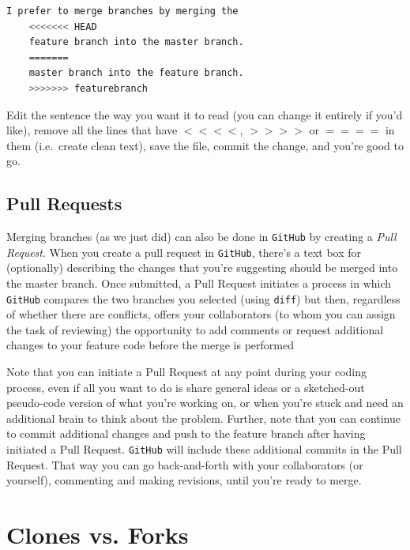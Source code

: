 \documentclass[12pt,letterpaper]{article}
\begin{document}
\begin{lstlisting}[language=bash]
	I prefer to merge branches by merging the
	<<<<<<< HEAD
	feature branch into the master branch.
	=======
	master branch into the feature branch.
	>>>>>>> featurebranch
\end{lstlisting}

\noindent
Edit the sentence the way you want it to read
(you can change it entirely if you'd like), 
remove all the lines that have $<<<<$, $>>>>$ or $====$ in them
(i.e.~create clean text), save the file, commit the change, and you're good to go.


\subsection{Pull Requests}

Merging branches (as we just did) can also be done in \texttt{GitHub} by creating a \emph{Pull Request}.
When you create a pull request in \texttt{GitHub}, there's a text box for (optionally) describing the changes that you're suggesting should be merged into the master branch.
Once submitted, a Pull Request initiates a process in which \texttt{GitHub} 
compares the two branches you selected (using \texttt{diff}) but then, 
regardless of whether there are conflicts, offers your collaborators
(to whom you can assign the task of reviewing)
the opportunity to add comments or request additional changes to your feature 
code before the merge is performed

Note that you can initiate a Pull Request at any point during your coding 
process, 
even if all you want to do is share general ideas or a sketched-out pseudo-code 
version of what you're working on, 
or when you're stuck and need an additional brain to think about the problem.
Further, note that you can continue to commit additional changes and push to 
the feature branch  after having initiated a Pull Request.
\texttt{GitHub} will include these additional commits in the Pull Request.  That 
way you can go back-and-forth with your collaborators (or yourself), 
commenting and making revisions, until you're ready to merge.



\section{Clones vs. Forks}
\end{document}
